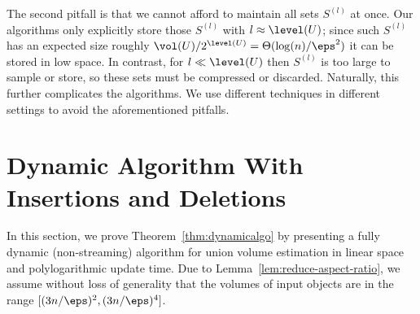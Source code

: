 %
The second pitfall is that we cannot afford to maintain all sets $S^{(l)}$ at once. Our algorithms only explicitly store those $S^{(l)}$ with $l \approx \level(U)$; since such $S^{(l)}$ has an expected size roughly $\vol(U)/2^{\level(U)} = \Theta(\log(n)/\eps^2)$ it can be stored in low space. In contrast, for $l \ll \level(U)$ then $S^{(l)}$ is too large to sample or store, so these sets must be compressed or discarded. Naturally, this further complicates the algorithms. We use different techniques in different settings to avoid the aforementioned pitfalls.
%
\section{Dynamic Algorithm With Insertions and Deletions}
\label{sec:dynamic}
%
In this section, we prove Theorem~\ref{thm:dynamicalgo} by presenting a fully dynamic (non-streaming) algorithm for union volume estimation in linear space and polylogarithmic update time. Due to Lemma~\ref{lem:reduce-aspect-ratio}, we assume without loss of generality that the volumes of input objects are in the range $[(3n/\eps)^2, (3n/\eps)^4]$.
%
